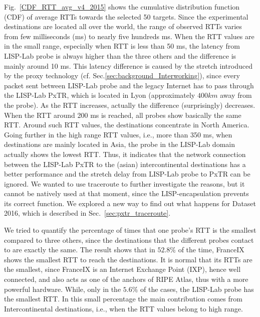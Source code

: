 Fig.~\ref{CDF_RTT_avg_v4_2015} shows the cumulative distribution function (CDF) of average RTTs towards the selected 50 targets. Since the experimental destinations are located all over the world, the range of observed RTTs varies from few milliseconds (ms) to nearly five hundreds ms. When the RTT values are in the small range, especially when RTT is less than 50 ms, the latency from LISP-Lab probe is always higher than the three others and the difference is mainly around 10 ms. This latency difference is caused by the stretch introduced by the proxy technology (cf. Sec.\ref{sec:background_Interworking}), since every packet sent between LISP-Lab probe and the legacy Internet has to pass through the LISP-Lab PxTR, which is located in Lyon (approximately $400km$ away from the probe). As the RTT increases, actually the difference (surprisingly) decreases. When the RTT around 200 ms is reached, all probes show basically the same RTT. Around such RTT values, the destinations concentrate in North America. Going further in the high range RTT values, i.e., more than 350 ms, when destinations are mainly located in Asia, the probe in the LISP-Lab domain actually shows the lowest RTT. Thus, it indicates that the network connection between the LISP-Lab PxTR to the (asian) intercontinental destinations has a better performance and the stretch delay from LISP-Lab probe to PxTR can be ignored. We wanted to use traceroute to further investigate the reasons, but it cannot be natively used at that moment, since the LISP-encapsulation prevents its correct function. We explored a new way to find out what happens for Dataset 2016, which is described in Sec.~\ref{sec:pxtr_traceroute}. 
    
We tried to quantify the percentage of times that one probe's RTT is the smallest compared to three others, since the destinations that the different probes contact to are exactly the same. The result shows that in $52.8\%$ of the time, FranceIX shows the smallest RTT to reach the destinations. It is normal that its RTTs are the smallest, since FranceIX is an Internet Exchange Point (IXP), hence well connected, and also acts as one of the anchors of RIPE Atlas, thus with a more powerful hardware. While, only in the $5.6\%$ of the cases, the LISP-Lab probe has the smallest RTT. In this small percentage the main contribution comes from Intercontinental destinations, i.e., when the RTT values belong to high range.
    
